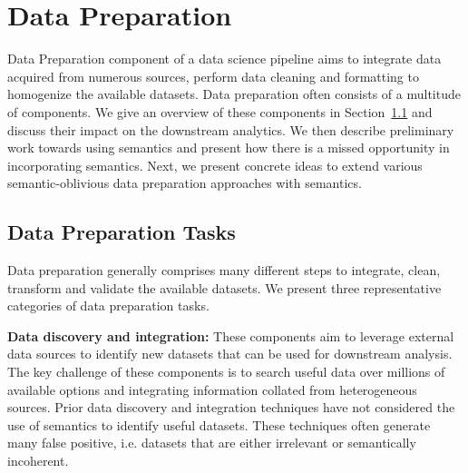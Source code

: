 \documentclass[sigconf, nonacm]{acmart}
\begin{document}
\section{Data Preparation}
\label{autofe_section}


Data Preparation component of a data science pipeline aims to integrate data acquired from numerous sources, perform data cleaning and formatting to homogenize the available datasets. Data preparation often consists of a multitude of components.
We give an overview of these components in Section~\ref{autofe_nonsem} and discuss their impact on the downstream analytics.
We then describe preliminary work towards using semantics and present how there is a missed opportunity in incorporating semantics. Next, we present concrete ideas to extend various semantic-oblivious data preparation approaches with semantics.
\subsection{Data Preparation Tasks}\label{autofe_nonsem}
Data preparation generally comprises many different steps to integrate, clean, transform and validate the available datasets. We present three representative categories of data preparation tasks.

\noindent \textbf{Data discovery and integration:} These components aim to leverage external data sources to identify new datasets that can be used for downstream analysis. The key challenge of these components is to search useful data over millions of available options and integrating information collated from heterogeneous sources. Prior data discovery and integration techniques have not considered the use of semantics to identify useful datasets. These techniques often generate many false positive, i.e. datasets that are either irrelevant or semantically incoherent. 
\end{document}
